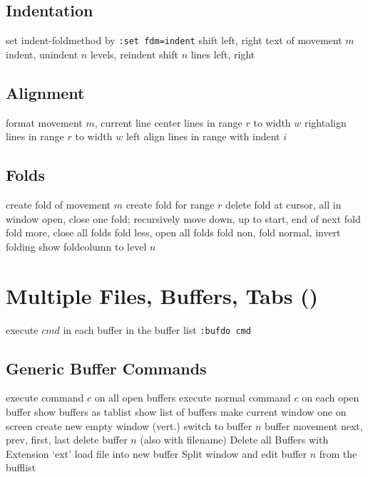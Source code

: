 \subsection{Indentation}{set indent-foldmethod by {\tt :set fdm=indent}}
	{shift left, right text of movement $m$}
	{indent, unindent $n$ levels, reindent}
	{shift $n$ lines left, right}

\subsection{Alignment}{}
	{format movement $m$, current line}
	{center lines in range $r$ to width $w$}
	{rightalign lines in range $r$ to width $w$}
	{left align lines in range with indent $i$}

\subsection{Folds}	{}
	{create fold of movement $m$}
	{create fold for range $r$}
	{delete fold at cursor, all in window}
	{open, close one fold; recursively}
	{move down, up to start, end of next fold}
	{fold more, close all folds}
	{fold less, open all folds}
	{fold non, fold normal, invert folding}
	{show foldcolumn to level $n$}

\section{Multiple Files, Buffers, Tabs (\enter)}	{execute $cmd$ in each buffer in the buffer list {\tt:bufdo cmd}}
\subsection{Generic Buffer Commands}	{}
	{execute command $c$ on all open buffers}
	{execute normal command $c$ on each open buffer} %
	{show buffers as tablist}
	{show list of buffers}
	{make current window one on screen}
	{create new empty window (vert.)}
	{switch to buffer $n$}
	{buffer movement next, prev, first, last}
	{delete buffer $n$ (also with filename)}
	{Delete all Buffers with Extension `ext'}
	{load file into new buffer}
	{Split window and edit buffer $n$ from the bufflist}

